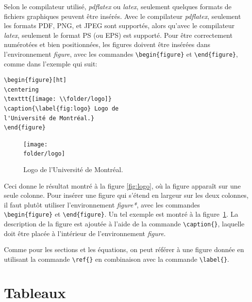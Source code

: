 \documentclass[10pt,letterpaper,twocolumn]{article}
\newcommand{\folder}{/home/eric/UdeM/session_5/Lab3/template}
\begin{document}
Selon le compilateur utilisé, {\em pdflatex} ou {\em latex}, seulement quelques formats de fichiers graphiques peuvent être insérés. Avec le compilateur {\em pdflatex}, seulement les formats PDF, PNG, et JPEG sont supportés, alors qu'avec le compilateur {\em latex}, seulement le format PS (ou EPS) est supporté. Pour être correctement numérotées et bien positionnées, les figures doivent être insérées dans l'environnement {\em figure}, avec les commandes \verb+\begin{figure}+ et \verb+\end{figure}+, comme dans l'exemple qui suit:
\begin{verbatim}
\begin{figure}[ht]
\centering
\texttt{[image: \\folder/logo]}
\caption{\label{fig:logo} Logo de 
l'Université de Montréal.}
\end{figure}
\end{verbatim}



\begin{figure}[t]
\centering
\texttt{[image: \\folder/logo]}
\caption{\label{fig:logo2} Logo de l'Université de Montréal.}
\end{figure}

Ceci donne le résultat montré à la figure \ref{fig:logo}, où la figure apparaît sur une seule colonne. Pour insérer une figure qui s'étend en largeur sur les deux colonnes, il faut plutôt utiliser l'environnement {\em figure*}, avec les commandes \verb+\begin{figure}+ et \verb+\end{figure}+. Un tel exemple est montré à la figure~\ref{fig:logo2}. La description de la figure est ajoutée à l'aide de la commande \verb+\caption{}+, laquelle doit être placée à l'intérieur de l'environnement {\em figure}.

Comme pour les sections et les équations, on peut référer à une figure donnée en utilisant la commande \verb|\ref{}| en combinaison avec la commande \verb|\label{}|.

\section{Tableaux}
\end{document}
